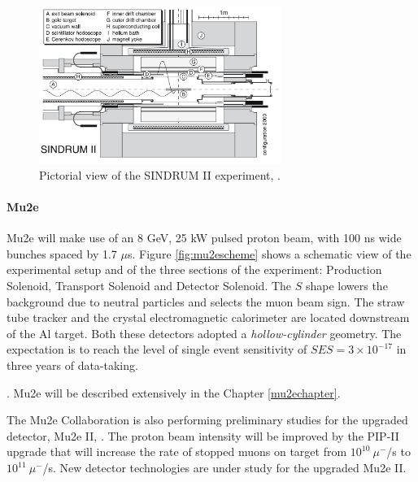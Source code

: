 \begin{figure}[!h]
\centering
\includegraphics[width =0.7\textwidth]{figures/png/Screenshot_20240307_163120.png}
\caption[SINDRUM II experiment.]{Pictorial view of the SINDRUM II experiment, \cite{SINDRUMII:2006dvw}.}
\label{fig:sindrumii}
\end{figure}
\paragraph{Mu2e}
Mu2e will make use of an 8 GeV, 
25 kW pulsed proton beam, with 100 
ns wide bunches spaced by 1.7 $\mu$s. 
Figure \ref{fig:mu2escheme} shows a 
schematic view of the experimental setup and of the
three sections of the experiment: 
Production Solenoid, Transport
Solenoid and Detector Solenoid. The 
$S$ shape lowers the background due to 
neutral particles and selects the 
muon beam sign. 
The straw tube tracker and the crystal 
electromagnetic calorimeter are located 
downstream of the Al target. 
Both these detectors adopted a 
\textit{hollow-cylinder} geometry. 
The expectation is to reach the level of single event sensitivity of 
$SES=3 \times 10^{-17}$ in three years of data-taking.


\cite{universe9010054}.
Mu2e will be described 
extensively in the Chapter \ref{mu2echapter}.

The Mu2e Collaboration is also 
performing preliminary studies for 
the upgraded detector, Mu2e II, \cite{dukes}. 
The proton beam intensity will be 
improved by the PIP-II upgrade that 
will increase the rate of stopped muons 
on target from $10^{10} \ \mu^-$/s 
to $10^{11} \ \mu^-$/s. New detector 
technologies are under study for the upgraded
Mu2e II.
